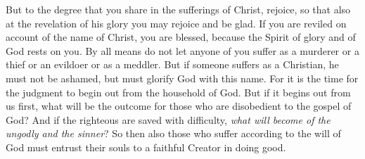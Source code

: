 \begin{biblechapter}
\verse But to the degree that you share in the sufferings of Christ, rejoice, so that also at the revelation of his glory you may rejoice and be glad.
\verse If you are reviled on account of the name of Christ, you are blessed, because the Spirit of glory and of God rests on you.
\verse By all means do not let anyone of you suffer as a murderer or a thief or an evildoer or as a meddler.
\verse But if someone suffers as a Christian, he must not be ashamed, but must glorify God with this name.
\verse For it is the time for the judgment to begin out from the household of God. But if it begins out from us first, what will be the outcome for those who are disobedient to the gospel of God?
\verse And if the righteous are saved with difficulty, \textit{what will become of the ungodly and the sinner}?
\verse So then also those who suffer according to the will of God must entrust their souls to a faithful Creator in doing good.
\end{biblechapter}

